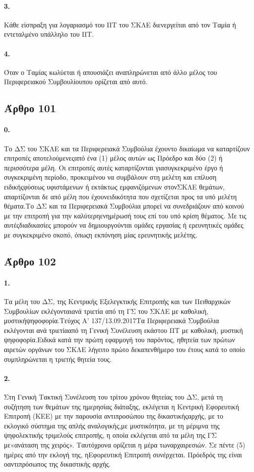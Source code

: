 \documentclass[a4paper,oneside, 10pt]{book}
\begin{document}
\paragraph { 3. } Κάθε είσπραξη για λογαριασμό του ΠΤ του ΣΚΛΕ διενεργείται από τον Ταμία ή εντεταλμένο υπάλληλο του ΠΤ.
\paragraph { 4. } Όταν ο Ταμίας κωλύεται ή απουσιάζει αναπληρώνεται από άλλο μέλος του Περιφερειακού Συμβουλίουπου ορίζεται από αυτό.
\subsection*{ Άρθρο 101 }
\paragraph { 0. } Το ΔΣ του ΣΚΛΕ και τα Περιφερειακά Συμβούλια έχουντο δικαίωμα να καταρτίζουν επιτροπές αποτελούμενεςαπό ένα (1) μέλος αυτών ως Πρόεδρο και δύο (2) ή περισσότερα μέλη. Οι επιτροπές αυτές καταρτίζονται γιασυγκεκριμένο έργο ή συγκεκριμένη περίοδο, προκειμένου να συμβάλουν στη μελέτη και επίλυση ειδικήςφύσεως υφιστάμενων ή εκτάκτως εμφανιζόμενων στονΣΚΛΕ θεμάτων, απαρτίζονται δε από μέλη που έχουνειδικότητα που σχετίζεται προς τα υπό μελέτη θέματα.Το ΔΣ και τα Περιφερειακά Συμβούλια μπορεί να συνεδριάζουν από κοινού με την επιτροπή για την καλύτερηενημέρωσή τους επί του υπό κρίση θέματος. Με τις αυτέςδιαδικασίες μπορούν να δημιουργούνται ομάδες εργασίας ή ερευνητικές ομάδες με συγκεκριμένο σκοπό, όπωςη εκπόνηση μίας ερευνητικής μελέτης.
\subsection*{ Άρθρο 102 }
\paragraph { 1. } Τα μέλη του ΔΣ, της Κεντρικής Εξελεγκτικής Επιτροπής και των Πειθαρχικών Συμβουλίων εκλέγονταιανά τριετία από τη ΓΣ του ΣΚΛΕ με καθολική, μυστικήψηφοφορία.Τεύχος Α’ 137/13.09.2017Τα Περιφερειακά Συμβούλια εκλέγονται ανά τριετίααπό τη Γενική Συνέλευση εκάστου ΠΤ με καθολική, μυστική ψηφοφορία.Ειδικά κατά την πρώτη εφαρμογή του παρόντος, ηθητεία των πρώτων αιρετών οργάνων του ΣΚΛΕ λήγειτο πρώτο δεκαπενθήμερο του έτους κατά το οποίο συμπληρώνεται η τριετής θητεία τους.
\paragraph { 2. } Στη Γενική Τακτική Συνέλευση του τρίτου χρόνου θητείας του ΔΣ, μετά τη συζήτηση των θεμάτων της ημερησίας διάταξης, εκλέγεται η Κεντρική Εφορευτική Επιτροπή (ΚΕΕ) με την παρουσία αντιπροσώπου της δικαστικήςαρχής, με το εκλογικό σύστημα της απλής αναλογικής,με μυστικότητα, με τη μέριμνα της ψηφολεκτικής τριμελούς επιτροπής, η οποία εκλέγεται από τα μέλη της ΓΣ με«ανάταση της χειρός». Ταυτόχρονα ορίζεται η μέρα τωναρχαιρεσιών. Σε πέντε (5) ημέρες από την εκλογή της, ηΕφορευτική Επιτροπή συνέρχεται. Πρόεδρός της είναι οαντιπρόσωπος της δικαστικής αρχής.
\end{document}
